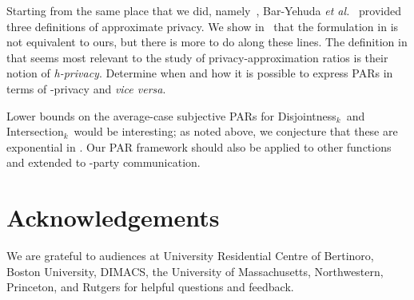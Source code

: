 \documentclass{article}
\theoremstyle{theorem}
\theoremstyle{definition}
\theoremstyle{remark}
\newcommand{\disjoint}{{\sc Dis\-joint\-ness}\ensuremath{_k}}
\newcommand{\intersection}{{\sc In\-ter\-sec\-tion}\ensuremath{_k}}
\begin{document}
Starting from the same place that we did,
namely~\cite{CK91,K92}, Bar-Yehuda {\it et al.}~\cite{BCKO} provided
three definitions of approximate privacy.  We show in~\cite{fjs09tr14} that
the formulation in \cite{BCKO} is not equivalent to ours, but there is more
to do along these lines.  The definition in \cite{BCKO} that seems most
relevant to the study of privacy-approximation ratios is their
notion of {\it h-privacy}. Determine when and how it is possible to
express PARs in terms of -privacy and {\it vice versa}.

Lower bounds on the average-case subjective PARs for \disjoint\ and \intersection\ would be interesting; as noted above, we conjecture that these are exponential in .  Our PAR framework should also be applied to other functions and extended to -party communication.



\section*{Acknowledgements}

We are grateful to audiences at University Residential Centre of Bertinoro, Boston University, DIMACS, the University of Massach\-usetts, Northwestern, Princeton, and Rutgers for helpful questions and feedback.
\end{document}
